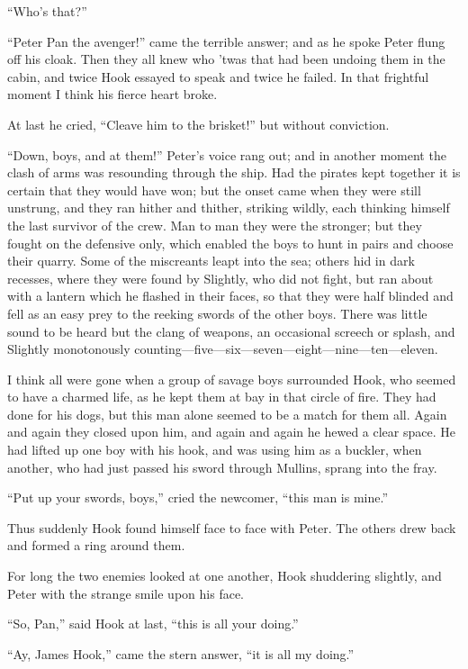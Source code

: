 ``Who's that?''

``Peter Pan the avenger!'' came the terrible answer; and as he spoke
Peter flung off his cloak. Then they all knew who 'twas that had been
undoing them in the cabin, and twice Hook essayed to speak and twice he
failed. In that frightful moment I think his fierce heart broke.

At last he cried, ``Cleave him to the brisket!'' but without conviction.

``Down, boys, and at them!'' Peter's voice rang out; and in another
moment the clash of arms was resounding through the ship. Had the
pirates kept together it is certain that they would have won; but the
onset came when they were still unstrung, and they ran hither and
thither, striking wildly, each thinking himself the last survivor of
the crew. Man to man they were the stronger; but they fought on the
defensive only, which enabled the boys to hunt in pairs and choose
their quarry. Some of the miscreants leapt into the sea; others hid in
dark recesses, where they were found by Slightly, who did not fight,
but ran about with a lantern which he flashed in their faces, so that
they were half blinded and fell as an easy prey to the reeking swords
of the other boys. There was little sound to be heard but the clang of
weapons, an occasional screech or splash, and Slightly monotonously
counting---five—six—seven—eight—nine—ten—eleven.

I think all were gone when a group of savage boys surrounded Hook, who
seemed to have a charmed life, as he kept them at bay in that circle of
fire. They had done for his dogs, but this man alone seemed to be a
match for them all. Again and again they closed upon him, and again and
again he hewed a clear space. He had lifted up one boy with his hook,
and was using him as a buckler, when another, who had just passed his
sword through Mullins, sprang into the fray.

``Put up your swords, boys,'' cried the newcomer, ``this man is mine.''

Thus suddenly Hook found himself face to face with Peter. The others
drew back and formed a ring around them.

For long the two enemies looked at one another, Hook shuddering
slightly, and Peter with the strange smile upon his face.

``So, Pan,'' said Hook at last, ``this is all your doing.''

``Ay, James Hook,'' came the stern answer, ``it is all my doing.''

